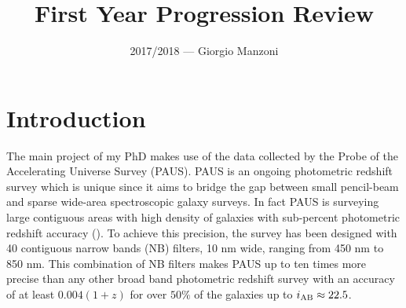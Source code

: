 \documentclass[11pt]{article}
\newcommand{\peg}{P$\&$G }
\begin{document}
\title{First Year Progression Review} %
\date{ }
\author{2017/2018 --- Giorgio Manzoni}
\maketitle
\abstract{In this document I report all the work done in my first year of the CDT PhD programme, and the work that I plan to do in the next upcoming years, under the supervision of Peder Norberg and Carlton Baugh. %
}
\tableofcontents

\section{Introduction}
\label{sec:intro}

The main project of my PhD makes use of the data collected by the Probe of the Accelerating Universe Survey (PAUS). PAUS is an ongoing photometric redshift survey which is unique since it aims to bridge the gap between small pencil-beam and sparse wide-area spectroscopic galaxy surveys. In fact PAUS is surveying large contiguous areas with high density of galaxies with sub-percent photometric redshift accuracy (\cite{eriksen18}). To achieve this precision, the survey has been designed with 40 contiguous narrow bands (NB) filters, 10 nm wide, ranging from 450 nm to 850 nm. This combination of NB filters makes PAUS up to ten times more precise than any other broad band photometric redshift survey with an accuracy of at least $0.004 (1+z)$ for over $50 \%$ of the galaxies up to $i_{\rm{AB}}\approx 22.5$. 
\end{document}
